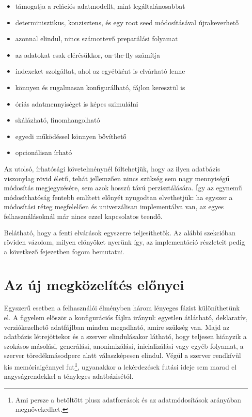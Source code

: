 \documentclass[
    parspace,
    noindent,
    nohyp,
]{elteiktdk}[2023/04/10]
\begin{document}
\begin{itemize}
    \item támogatja a relációs adatmodellt, mint legáltalánosabbat
    \item determinisztikus, konzisztens, és egy root seed módosításával újrakeverhető
    \item azonnal elindul, nincs számottevő preparálási folyamat
    \item az adatokat csak elérésükkor, on-the-fly számítja
    \item indexeket szolgáltat, ahol az egyébként is elvárható lenne
    \item könnyen és rugalmasan konfigurálható, fájlon keresztül is
    \item óriás adatmennyiséget is képes szimulálni
    \item skálázható, finomhangolható
    \item egyedi működéssel könnyen bővíthető
    \item opcionálisan írható
\end{itemize}

Az utolsó, írhatósági követelménynél föltehetjük, hogy az ilyen adatbázis viszonylag rövid életű,
tehát jellemzően nincs szükség sem nagy mennyiségű módosítás megjegyzésére,
sem azok hosszú távú perzisztálására.
Így az egynemű módosíthatóság fentebb említett előnyét nyugodtan elvethetjük:
ha egyszer a módosítási réteg megfelelően és univerzálisan implementálva van,
az egyes felhasználásoknál már nincs ezzel kapcsolatos teendő.

Belátható, hogy a fenti elvárások egyszerre teljesíthetők.
Az alábbi szekcióban röviden vázolom, milyen előnyöket nyerünk így,
az implementáció részleteit pedig a következő fejezetben fogom bemutatni.


\section{Az új megközelítés előnyei}

Egyszerű esetben a felhasználói élményben három lényeges fázist különíthetünk el.
A figyelem először a konfigurációs fájlra irányul:
egyetlen átlátható, deklaratív, verziókezelhető adatfájlban minden megadható, amire szükség van.
Majd az adatbázis létrejöttekor és a szerver elindulásakor látható,
hogy teljesen hiányzik a szokásos másolási, generálási, anonimizálási, inicializálási vagy egyéb folyamat,
a szerver töredékmásodperc alatt válaszképesen elindul.
Végül a szerver rendkívül kis memóriaigénnyel fut\footnote{
    Ami persze a betöltött plusz adatforrások és az adatmódosítások arányában megnövekedhet.
},
ugyanakkor a lekérdezések futási ideje sem marad el nagyságrendekkel a tényleges adatbázisétól.
\end{document}
